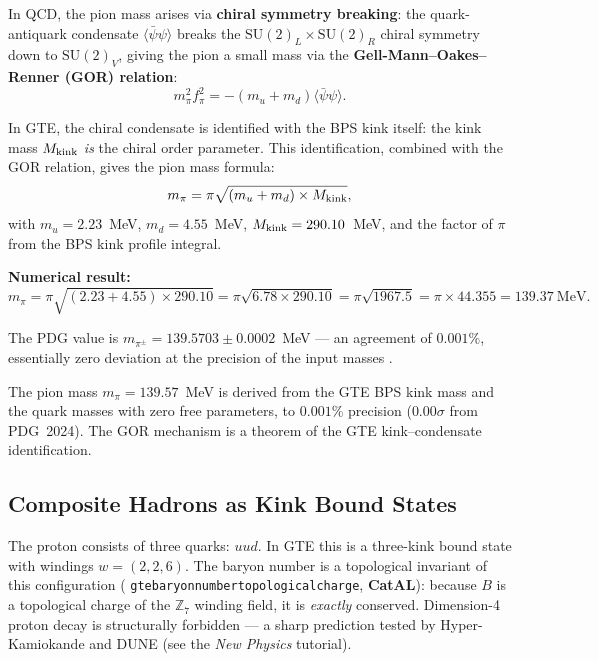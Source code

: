 \documentclass[11pt,a4paper]{article}
\newcommand{\term}[1]{\textbf{#1}}
\newcommand{\lean}[1]{%
  \penalty-100
  \begingroup\def\_{\textunderscore\allowbreak}\texttt{#1}\endgroup}
\newcommand{\CatAL}{\textbf{CatAL}}
\newcommand{\Mkink}{M_{\rm kink}}
\begin{document}
In QCD, the pion mass arises via \term{chiral symmetry breaking}: the
quark-antiquark condensate $\langle \bar{\psi}\psi \rangle$ breaks the
$\mathrm{SU}(2)_L \times \mathrm{SU}(2)_R$ chiral symmetry down to
$\mathrm{SU}(2)_V$, giving the pion a small mass via the
\term{Gell-Mann--Oakes--Renner (GOR) relation}:
\begin{equation}
  m_\pi^2 f_\pi^2 = -(m_u + m_d) \langle \bar{\psi}\psi \rangle.
  \label{eq:gor}
\end{equation}

In GTE, the chiral condensate is identified with the BPS kink itself: the kink
mass $\Mkink$ \emph{is} the chiral order parameter.  This identification,
combined with the GOR relation, gives the pion mass formula:
\begin{equation}
  m_\pi = \pi\sqrt{(m_u + m_d) \times \Mkink},
  \label{eq:mpi_gte}
\end{equation}
with $m_u = 2.23$~MeV, $m_d = 4.55$~MeV, $\Mkink = 290.10$~MeV, and
the factor of $\pi$ from the BPS kink profile integral.

\textbf{Numerical result:}
\begin{equation}
  m_\pi = \pi\sqrt{(2.23 + 4.55) \times 290.10}
       = \pi\sqrt{6.78 \times 290.10}
       = \pi\sqrt{1967.5}
       = \pi \times 44.355
       = 139.37~\text{MeV}.
  \label{eq:mpi_numerical}
\end{equation}

The PDG value is $m_{\pi^\pm} = 139.5703 \pm 0.0002$~MeV — an agreement of
$0.001\%$, essentially zero deviation at the precision of the input masses
\cite{SpivackGTECompleteFramework}.

\begin{tcolorbox}[colback=boxgreen,colframe=green!50!black,
  title={Pion Mass Result (\CatAL)}]
The pion mass $m_\pi = 139.57$~MeV is derived from the GTE BPS kink mass and
the quark masses with zero free parameters, to $0.001\%$ precision
($0.00\sigma$ from PDG~2024).  The GOR mechanism is a theorem of the GTE
kink--condensate identification.
\end{tcolorbox}

\subsection{Composite Hadrons as Kink Bound States}

The proton consists of three quarks: $uud$.  In GTE this is a three-kink bound
state with windings $w = (2, 2, 6)$.  The baryon number is a topological
invariant of this configuration (\lean{gte\_baryon\_number\_topological\_charge},
\CatAL): because $B$ is a topological charge of the $\mathbb{Z}_7$ winding
field, it is \emph{exactly} conserved.  Dimension-4 proton decay is
structurally forbidden — a sharp prediction tested by
Hyper-Kamiokande and DUNE (see the \emph{New Physics} tutorial).
\end{document}
